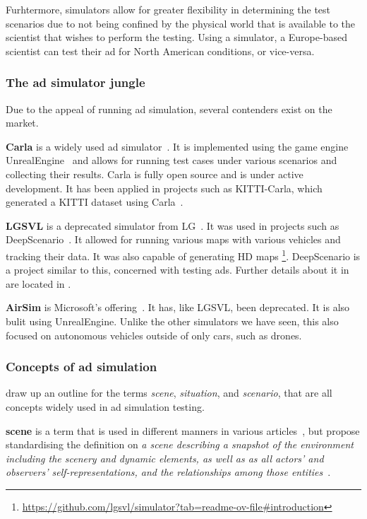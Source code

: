 Furhtermore, simulators allow for greater flexibility in determining the test scenarios due to not
being confined by the  physical world that is available to the scientist that wishes to perform the
testing. Using a simulator, a Europe-based scientist can test their \acrshort{ad} for North American
conditions, or vice-versa.

\subsubsection*{The \acrshort{ad} simulator jungle}\label{sec:simulatorOverview}

Due to the appeal of running \acrshort{ad} simulation, several contenders exist
on the market.

\textbf{Carla} is a widely used \acrshort{ad} simulator~\cite{Carla}. It is implemented
using the game engine UnrealEngine~\cite{unrealengine} and allows for running
test cases under various scenarios and collecting their results. Carla is fully
open source and is under active development. It has been applied in projects such as KITTI-Carla,
which generated a KITTI dataset using Carla~\cite{kittiCarla}.

\textbf{LGSVL} is a deprecated simulator from LG~\cite{lgsvl}. It was used in projects such
as DeepScenario~\cite{DeepScenario}. It allowed for running various maps with various vehicles and
tracking their data. It was also capable of generating HD
maps \footnote{\url{https://github.com/lgsvl/simulator?tab=readme-ov-file\#introduction}}.
DeepScenario is a project similar to this, concerned with testing \acrlong{ads}. Further details
about it in are located in .

\textbf{AirSim} is Microsoft's offering~\cite{airsim}. It has, like LGSVL,
been deprecated. It is also bulit using UnrealEngine. Unlike the other
simulators we have seen, this also focused on autonomous vehicles outside of
only cars, such as drones.


\subsubsection*{Concepts of \acrshort{ad} simulation}\label{sec:adsSimConcepts}

\citeauthor{scenes} draw up an outline for the terms \textit{scene}, \textit{situation}, and
\textit{scenario}, that are all concepts widely used in \acrshort{ad} simulation testing.

\textbf{scene} is a term that is used in different manners in various
articles~\cite[982]{scenes}, but \citeauthor{scenes} propose standardising the definition on
\textit{a scene describing a snapshot of the environment including the scenery and dynamic elements,
    as well as  as all actors’ and observers’ self-representations, and the relationships among those entities}~\cite[983]{scenes}.

